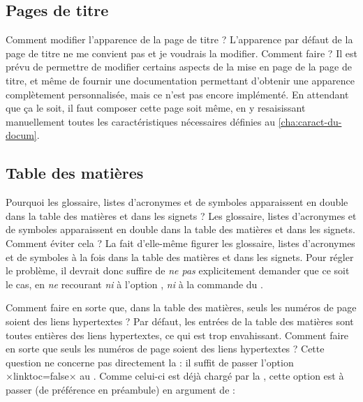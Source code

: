 \subsection{Pages de titre}
\label{sec:pages-de-titre}

\begin{dbfaq}{Comment modifier l'apparence de la page de titre ?}{}
  L'apparence par défaut de la page de titre ne me convient pas et je voudrais
  la modifier. Comment faire ?
  \tcblower
  Il est prévu de permettre de modifier certains aspects de la mise en page de
  la page de titre, et même de fournir une documentation permettant d'obtenir
  une apparence complètement personnalisée, mais ce n'est pas encore
  implémenté.  En attendant que ça le soit, il faut composer cette page soit
  même, en y resaisissant manuellement toutes les caractéristiques nécessaires
  définies au \vref{cha:caract-du-docum}.
\end{dbfaq}

\subsection{Table des matières}
\label{sec:table-des-matieres-faq}

\begin{dbfaq}{Pourquoi les glossaire, listes d'acronymes et de symboles
    apparaissent en double dans la table des matières et dans les signets ?}{}
  Les glossaire, listes d'acronymes et de symboles apparaissent en double dans
  la table des matières et dans les signets. Comment éviter cela ?%
  \tcblower
  La \yatcl{} fait d'elle-même figurer les glossaire, listes d'acronymes et de
  symboles à la fois dans la table des matières et dans les signets. Pour
  régler le problème, il devrait donc suffire de \emph{ne pas} explicitement
  demander que ce soit le cas, en \emph{ne} recourant \emph{ni} à l'option
  , \emph{ni} à la commande  du
  .
\end{dbfaq}

\begin{dbfaq}{Comment faire en sorte que, dans la table des matières, seuls
    les numéros de page soient des liens hypertextes ?}{}
  Par défaut, les entrées de la table des matières sont toutes entières des
  liens hypertextes, ce qui est trop envahissant. Comment faire en sorte que
  seuls les numéros de page soient des liens hypertextes ?
  \tcblower
  Cette question ne concerne pas directement la \yatcl{} : il suffit de passer
  l'option ×linktoc=false× au . Comme celui-ci est déjà
  chargé par la \yatcl{}, cette option est à passer (de préférence en
  préambule) en argument de  :
\begin{preamblecode}
\hypersetup{linktoc=false}
\end{preamblecode}
\end{dbfaq}

